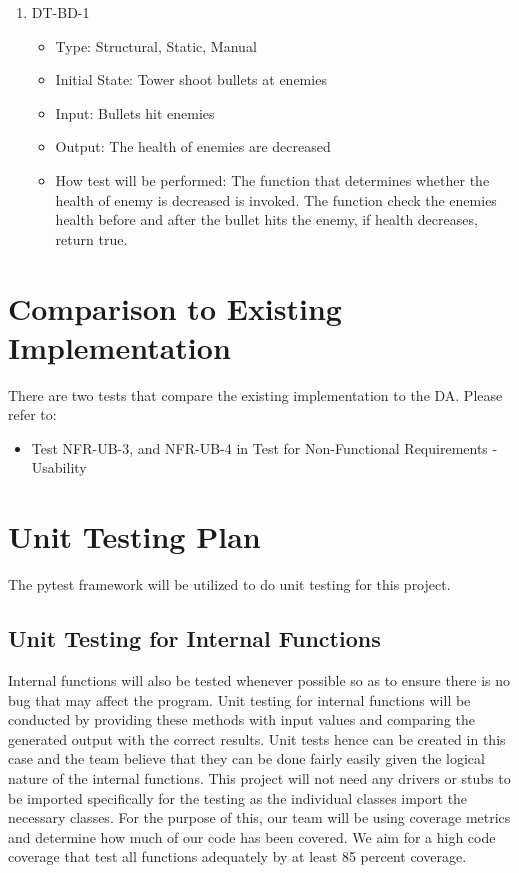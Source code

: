 \documentclass[12,english]{article}
\begin{document}
\begin{enumerate}
    \item DT-BD-1
    \begin{itemize}
        \item Type: Structural, Static, Manual
        \item Initial State: Tower shoot bullets at enemies
        \item Input: Bullets hit enemies
        \item Output: The health of enemies are decreased
        \item How test will be performed: The function that determines whether the health of enemy is decreased is invoked. The function check the enemies health before and after the bullet hits the enemy, if health decreases, return true.
    \end{itemize}
\end{enumerate}

\section{Comparison to Existing Implementation}
There are two tests that compare the existing implementation to the DA. Please refer to:
\begin{itemize}
    \item Test NFR-UB-3, and NFR-UB-4 in Test for Non-Functional Requirements - Usability
\end{itemize}

\section{Unit Testing Plan}
The pytest framework will be utilized to do unit testing for this project.
\subsection{Unit Testing for Internal Functions}
Internal functions will also be tested whenever possible so as to ensure there is no bug that may affect the program. Unit testing for internal functions will be conducted by providing these methods with input values and comparing the generated output with the correct results. Unit tests hence can be created in this case and the team believe that they can be done fairly easily given the logical nature of the internal functions. This project will not need any drivers or stubs to be imported specifically for the testing as the individual classes import the necessary classes. For the purpose of this, our team will be using coverage metrics and determine how much of our code has been covered. We aim for a high code coverage that test all functions adequately by at least 85 percent coverage.
\end{document}
